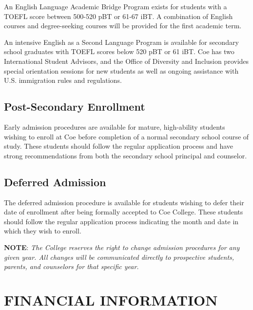 \documentclass[
  letterpaper,
]{scrbook}
\renewcommand{\part}[1]{\addcontentsline{toc}{part}{#1}}
\begin{document}
An English Language Academic Bridge Program exists for students with a
TOEFL score between 500-520 pBT or 61-67 iBT. A combination of English
courses and degree-seeking courses will be provided for the first
academic term.

An intensive English as a Second Language Program is available for
secondary school graduates with TOEFL scores below 520 pBT or 61 iBT.
Coe has two International Student Advisors, and the Office of Diversity
and Inclusion provides special orientation sessions for new students as
well as ongoing assistance with U.S. immigration rules and regulations.

\section{Post-Secondary Enrollment}\label{post-secondary-enrollment}

Early admission procedures are available for mature, high-ability
students wishing to enroll at Coe before completion of a normal
secondary school course of study. These students should follow the
regular application process and have strong recommendations from both
the secondary school principal and counselor.

\section{Deferred Admission}\label{deferred-admission}

The deferred admission procedure is available for students wishing to
defer their date of enrollment after being formally accepted to Coe
College. These students should follow the regular application process
indicating the month and date in which they wish to enroll.

\textbf{NOTE}: \emph{The College reserves the right to change admission
procedures for any given year. All changes will be communicated directly
to prospective students, parents, and counselors for that specific
year.}

\part{FINANCIAL RESOURCES}

\chapter{FINANCIAL INFORMATION}\label{sec-financial-information}
\end{document}
